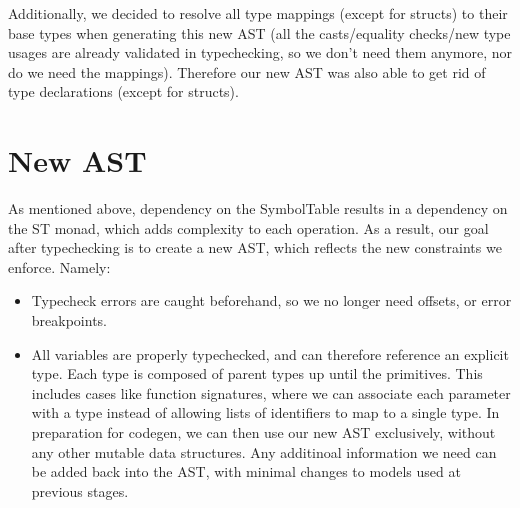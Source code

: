 \documentclass[11pt]{article}
\begin{document}
Additionally, we decided to resolve all type mappings (except for
structs) to their base types when generating this new AST (all the
casts/equality checks/new type usages are already validated in
typechecking, so we don't need them anymore, nor do we need the
mappings). Therefore our new AST was also able to get rid of type
declarations (except for structs).
\section{New AST}
\label{sec:org1687bb2}
As mentioned above, dependency on the SymbolTable results in a
dependency on the ST monad, which adds complexity to each operation.
As a result, our goal after typechecking is to create a new AST,
which reflects the new constraints we enforce.  Namely:
\begin{itemize}
\item Typecheck errors are caught beforehand, so we no longer need offsets,
or error breakpoints.
\item All variables are properly typechecked, and can therefore reference an 
explicit type. Each type is composed of parent types up until
the primitives.  This includes cases like function signatures,
where we can associate each parameter with a type instead of
allowing lists of identifiers to map to a single type.  In
preparation for codegen, we can then use our new AST
exclusively, without any other mutable data structures. Any
additinoal information we need can be added back into the AST,
with minimal changes to models used at previous stages.
\end{itemize}
\end{document}

